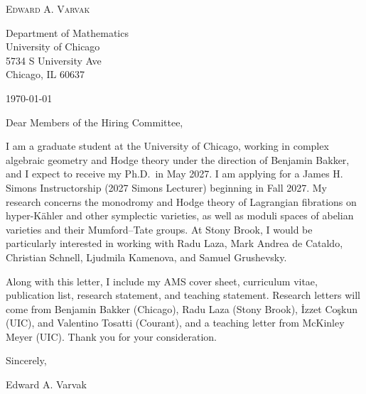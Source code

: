 \documentclass[12pt]{article}
\begin{document}
\begin{center}
  {\Large\textsc{Edward A. Varvak}}\\[10pt]
\end{center}

Department of Mathematics \\
University of Chicago \\
5734 S University Ave \\
Chicago, IL 60637

\today

Dear Members of the Hiring Committee,

I am a graduate student at the University of Chicago, working in complex
algebraic geometry and Hodge theory under the direction of Benjamin Bakker,
and I expect to receive my Ph.D.\ in May 2027. I am applying for a James H.
Simons Instructorship (2027 Simons Lecturer) beginning in Fall 2027. My
research concerns the monodromy and Hodge theory of Lagrangian fibrations on
hyper-K\"ahler and other symplectic varieties, as well as moduli spaces of
abelian varieties and their Mumford--Tate groups. At Stony Brook, I would be
particularly interested in working with Radu Laza, Mark Andrea de Cataldo,
Christian Schnell, Ljudmila Kamenova, and Samuel Grushevsky.

Along with this letter, I include my AMS cover sheet, curriculum vitae,
publication list, research statement, and teaching statement. Research
letters will come from Benjamin Bakker (Chicago), Radu Laza (Stony Brook),
\.{I}zzet Co\c{s}kun (UIC), and Valentino Tosatti (Courant), and a teaching
letter from McKinley Meyer (UIC). Thank you for your consideration.

Sincerely,

Edward A. Varvak
\end{document}
